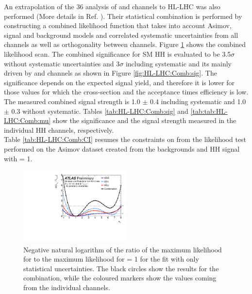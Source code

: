 An extrapolation of the 36 \ifb analysis of \bbbb and \bbtt channels to HL-LHC was also performed (More details in Ref. \cite{Europ}). Their statistical combination is performed by constructing a combined likelihood function that takes into account Asimov, signal and background models and correlated systematic uncertainties from all channels as well as orthogonality between channels. Figure \ref{fig:HL-LHC:Comb:LH} shows the combined likelihood scan. The combined significance for SM HH is evaluated to be 3.5$\sigma$ without systematic uncertainties and 3$\sigma$ including systematic and its mainly driven by \bbtt and \bbyy channels as shown in Figure \ref{fig:HL-LHC:Comb:sig}. The significance depends on the expected signal yield, and therefore it is lower for those \kl values for which the cross-section and the acceptance times efficiency is low. The measured combined signal strength is 1.0 $\pm$ 0.4 including systematic and 1.0 $\pm$ 0.3 without systematic. Tables \ref{tab:HL-LHC:Comb:sig} and \ref{tab:tab:HL-LHC:Comb:mu} show the significance and the signal strength measured in the individual HH channels, respectively. \\
Table \ref{tab:HL-LHC:Comb:CI} resumes the constraints on \kl from the likelihood test performed on the Asimov dataset created from the backgrounds and HH signal with \kl= 1.  
\begin{figure}[htbp]
    \centering
    \includegraphics[width=0.5\textwidth]{Ch6/Img/figures_combination_bbbb_bbtt_bbyy_lHHH0100_NoSyst_overlay_Preliminary.pdf}
    \caption{Negative natural logarithm of the ratio of the maximum likelihood for \kl to the maximum likelihood for \kl = 1 for the fit with only statistical uncertainties. The black circles show the results for the combination, while the coloured markers show the values coming from the individual channels.}
    \label{fig:HL-LHC:Comb:LH}
\end{figure}

